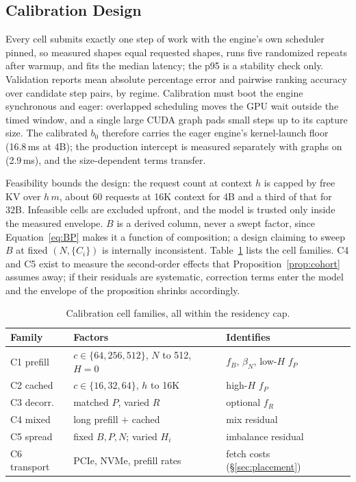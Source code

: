 \documentclass[10pt,twocolumn]{article}
\begin{document}
\subsection{Calibration Design}
\label{sec:calib}

Every cell submits exactly one step of work with the engine's own scheduler pinned, so measured shapes equal requested shapes, runs five randomized repeats after warmup, and fits the median latency; the p95 is a stability check only. Validation reports mean absolute percentage error and pairwise ranking accuracy over candidate step pairs, by regime. Calibration must boot the engine synchronous and eager: overlapped scheduling moves the GPU wait outside the timed window, and a single large CUDA graph pads small steps up to its capture size. The calibrated $b_0$ therefore carries the eager engine's kernel-launch floor (16.8\,ms at 4B); the production intercept is measured separately with graphs on (2.9\,ms), and the size-dependent terms transfer.

Feasibility bounds the design: the request count at context $h$ is capped by free KV over $h\,m$, about 60 requests at 16K context for 4B and a third of that for 32B. Infeasible cells are excluded upfront, and the model is trusted only inside the measured envelope. $B$ is a derived column, never a swept factor, since Equation~\eqref{eq:BP} makes it a function of composition; a design claiming to sweep $B$ at fixed $(N, \{C_i\})$ is internally inconsistent. Table~\ref{tab:calib} lists the cell families. C4 and C5 exist to measure the second-order effects that Proposition~\ref{prop:cohort} assumes away; if their residuals are systematic, correction terms enter the model and the envelope of the proposition shrinks accordingly.

\begin{table}[t]
\centering
\small
\begin{tabular}{lll}
\toprule
Family & Factors & Identifies \\
\midrule
C1 prefill & $c \in \{64,256,512\}$, $N$ to 512, $H{=}0$ & $f_B$, $\beta_N$, low-$H$ $f_P$ \\
C2 cached & $c \in \{16,32,64\}$, $h$ to 16K & high-$H$ $f_P$ \\
C3 decorr. & matched $P$, varied $R$ & optional $f_R$ \\
C4 mixed & long prefill $+$ cached & mix residual \\
C5 spread & fixed $B,P,N$; varied $H_i$ & imbalance residual \\
C6 transport & PCIe, NVMe, prefill rates & fetch costs (\S\ref{sec:placement}) \\
\bottomrule
\end{tabular}
\caption{Calibration cell families, all within the residency cap.}
\label{tab:calib}
\end{table}
\end{document}
